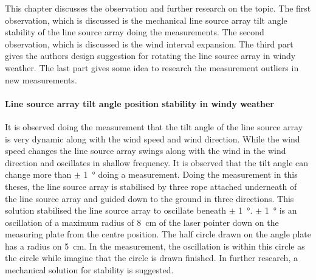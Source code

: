 This chapter discusses the observation and further research on the topic. The first observation, which is discussed is the mechanical line source array tilt angle stability of the line source array doing the measurements. The second observation, which is discussed is the wind interval expansion. The third part gives the authors design suggestion for rotating the line source array in windy weather. The last part gives some idea to research the measurement outliers in new measurements.


\paragraph{Line source array tilt angle position stability in windy weather} 
It is observed doing the measurement that the tilt angle of the line source array is very dynamic along with the wind speed and wind direction. While the wind speed changes the line source array swings along with the wind in the wind direction and oscillates in shallow frequency. It is observed that the tilt angle can change more than $\pm$ \SI{1}{\degree} doing a measurement.  Doing the measurement in this theses, the line source array is stabilised by three rope attached underneath of the line source array and guided down to the ground in three directions. This solution stabilised the line source array to oscillate beneath  $\pm$ \SI{1}{\degree}. $\pm$ \SI{1}{\degree} is an oscillation of a maximum radius of \SI{8}{\centi\meter} of the laser pointer down on the measuring plate from the centre position. The half circle drawn on the angle plate has a radius on \SI{5}{\centi\meter}. In the measurement, the oscillation is within this circle as the circle while imagine that the circle is drawn finished. In further research, a mechanical solution for stability is suggested. 



